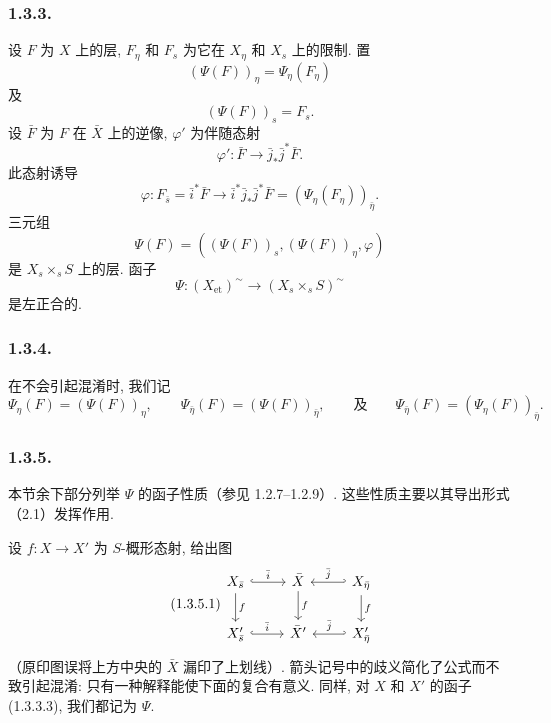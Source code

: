 \subsubsection*{1.3.3.}
设 $F$ 为 $X$ 上的层, $F_\eta$ 和 $F_s$ 为它在 $X_\eta$ 和 $X_s$ 上的限制. 置
\begin{equation}\tag{1.3.3.1}
(\Psi(F))_\eta=\Psi_\eta(F_\eta)
\end{equation}
及
\begin{equation}\tag{1.3.3.2}
(\Psi(F))_s=F_s.
\end{equation}
设 $\bar F$ 为 $F$ 在 $\bar X$ 上的逆像, $\varphi'$ 为伴随态射
\begin{equation*}
\varphi':\bar F\longrightarrow\bar j_*\bar j^*\bar F.
\end{equation*}
此态射诱导
\begin{equation*}
\varphi:F_{\bar s}=\bar i^*\bar F
\longrightarrow
\bar i^*\bar j_*\bar j^*\bar F
=(\Psi_\eta(F_\eta))_{\bar\eta}.
\end{equation*}
三元组
\begin{equation*}
\Psi(F)=((\Psi(F))_s,(\Psi(F))_\eta,\varphi)
\end{equation*}
是 $X_s\times_sS$ 上的层. 函子
\begin{equation}\tag{1.3.3.3}
\Psi:(X_{\mathrm{et}})^{\sim}
\longrightarrow(X_s\times_sS)^{\sim}
\end{equation}
是左正合的.

\subsubsection*{1.3.4.}
在不会引起混淆时, 我们记
\begin{equation*}
\Psi_\eta(F)=(\Psi(F))_\eta,
\qquad
\Psi_{\bar\eta}(F)=(\Psi(F))_{\bar\eta},
\qquad\text{及}\qquad
\Psi_{\bar\eta}(F)=(\Psi_\eta(F))_{\bar\eta}.
\end{equation*}

\subsubsection*{1.3.5.}
本节余下部分列举 $\Psi$ 的函子性质（参见 1.2.7--1.2.9）. 这些性质主要以其导出形式（2.1）发挥作用.

设 $f:X\longrightarrow X'$ 为 $S$-概形态射, 给出图
\begin{equation}\tag{1.3.5.1}
\begin{tikzcd}
X_{\bar s} \arrow[r, hook, "\bar i"] \arrow[d, "f"]
  & \bar X \arrow[d, "f"]
  & X_{\bar\eta} \arrow[l, hook', "\bar j"'] \arrow[d, "f"] \\
X'_{\bar s} \arrow[r, hook, "\bar i"]
  & \bar X' & X'_{\bar\eta} \arrow[l, hook', "\bar j"']
\end{tikzcd}
\end{equation}
（原印图误将上方中央的 $\bar X$ 漏印了上划线）. 箭头记号中的歧义简化了公式而不致引起混淆: 只有一种解释能使下面的复合有意义. 同样, 对 $X$ 和 $X'$ 的函子 (1.3.3.3), 我们都记为 $\Psi$.

